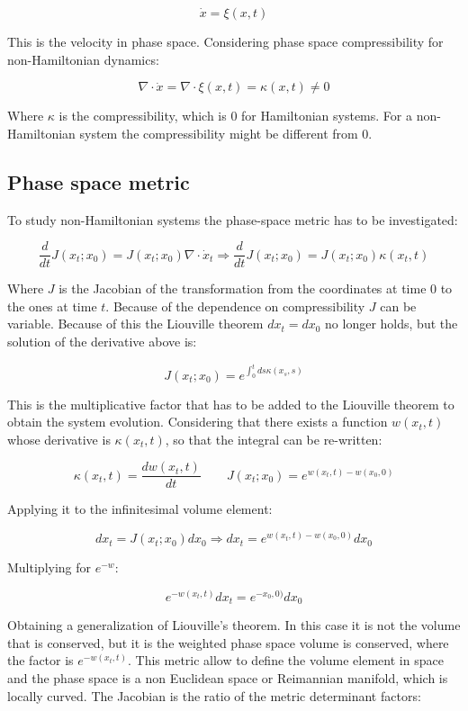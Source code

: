 $$\dot{x} = \xi(x, t)$$

This is the velocity in phase space.
Considering phase space compressibility for non-Hamiltonian dynamics:

$$\nabla\cdot\dot{x} = \nabla\cdot\xi(x, t) = \kappa(x, t)\neq 0$$

Where $\kappa$ is the compressibility, which is $0$ for Hamiltonian systems.
For a non-Hamiltonian system the compressibility might be different from $0$.

	\subsection{Phase space metric}
	To study non-Hamiltonian systems the phase-space metric has to be investigated:

	$$\frac{d}{dt}J(x_t;x_0) = J(x_t;x_0)\nabla\cdot\dot{x}_t\Rightarrow\frac{d}{dt}J(x_t;x_0) = J(x_t;x_0)\kappa(x_t, t)$$

	Where $J$ is the Jacobian of the transformation from the coordinates at time $0$ to the ones at time $t$.
	Because of the dependence on compressibility $J$ can be variable.
	Because of this the Liouville theorem $dx_t = dx_0$ no longer holds, but the solution of the derivative above is:

	$$J(x_t;x_0) = e^{\int_0^tds\kappa(x_s, s)}$$

	This is the multiplicative factor that has to be added to the Liouville theorem to obtain the system evolution.
	Considering that there exists a function $w(x_t,t)$ whose derivative is $\kappa(x_t, t)$, so that the integral can be re-written:

	$$\kappa(x_t, t) = \frac{dw(x_t, t)}{dt}\qquad J(x_t; x_0) = e^{w(x_t, t)-w(x_0, 0)}$$

	Applying it to the infinitesimal volume element:

	$$dx_t = J(x_t;x_0)dx_0\Rightarrow dx_t = e^{w(x_t, t) - w(x_0, 0)}dx_0$$

	Multiplying for $e^{-w}$:

	$$e^{-w(x_t, t)}dx_t = e^{-x_0, 0)}dx_0$$

	Obtaining a generalization of Liouville's theorem.
	In this case it is not the volume that is conserved, but it is the weighted phase space volume is conserved, where the factor is $e^{-w(x_t, t)}$.
	This metric allow to define the volume element in space and the phase space is a non Euclidean space or Reimannian manifold, which is locally curved.
	The Jacobian is the ratio of the metric determinant factors:

